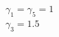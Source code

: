 \documentclass[preview]{standalone}
\begin{document}
\begin{center}
$\gamma_1 = \gamma_5 = 1$\\$\gamma_3 = 1.5$
\end{center}
\end{document}
